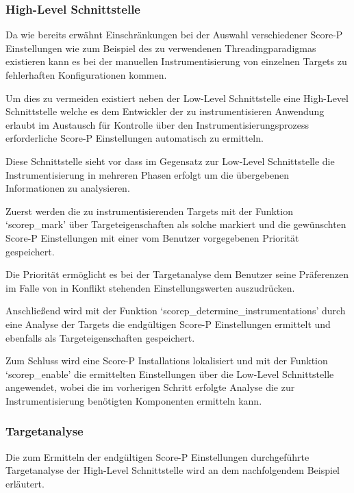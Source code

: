 \documentclass[german,proseminar,hyperref,utf8]{zihpub}
\begin{document}
    \subsubsection{High-Level Schnittstelle}
    Da wie bereits erwähnt Einschränkungen bei der Auswahl verschiedener Score-P Einstellungen wie zum
    Beispiel des zu verwendenen Threadingparadigmas existieren kann es bei der manuellen Instrumentisierung
    von einzelnen Targets zu fehlerhaften Konfigurationen kommen.

    Um dies zu vermeiden existiert neben der Low-Level Schnittstelle eine High-Level Schnittstelle
    welche es dem Entwickler der zu instrumentisieren Anwendung erlaubt im Austausch für Kontrolle
    über den Instrumentisierungsprozess erforderliche Score-P Einstellungen automatisch zu ermitteln.

    Diese Schnittstelle sieht vor dass im Gegensatz zur Low-Level Schnittstelle die Instrumentisierung
    in mehreren Phasen erfolgt um die übergebenen Informationen zu analysieren.

    Zuerst werden die zu instrumentisierenden Targets mit der Funktion `scorep\_mark' über Targeteigenschaften
    als solche markiert und die gewünschten Score-P Einstellungen mit einer vom Benutzer vorgegebenen
    Priorität gespeichert.

    Die Priorität ermöglicht es bei der Targetanalyse dem Benutzer seine Präferenzen im Falle von
    in Konflikt stehenden Einstellungswerten auszudrücken.

    Anschlie{\ss}end wird mit der Funktion `scorep\_determine\_instrumentations' durch eine Analyse der Targets
    die endgültigen Score-P Einstellungen ermittelt und ebenfalls als Targeteigenschaften gespeichert.

    Zum Schluss wird eine Score-P Installations lokalisiert und mit der Funktion `scorep\_enable'
    die ermittelten Einstellungen über die Low-Level Schnittstelle angewendet, wobei die im vorherigen
    Schritt erfolgte Analyse die zur Instrumentisierung benötigten Komponenten ermitteln kann.

    \subsubsection{Targetanalyse}
    Die zum Ermitteln der endgültigen Score-P Einstellungen durchgeführte Targetanalyse der High-Level
    Schnittstelle wird an dem nachfolgendem Beispiel erläutert.
\end{document}
